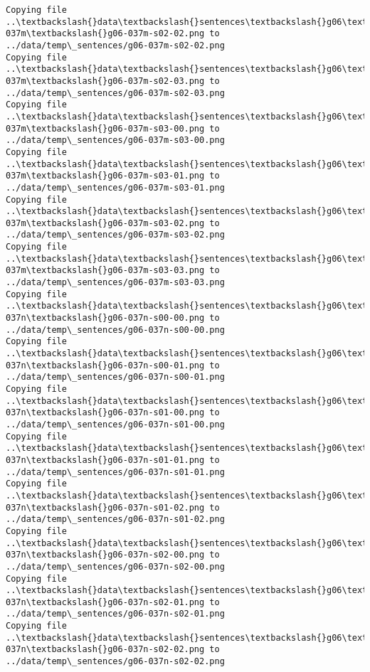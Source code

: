 \documentclass[11pt]{article}
\begin{document}
\begin{Verbatim}[commandchars=\\\{\}]
Copying file ..\textbackslash{}data\textbackslash{}sentences\textbackslash{}g06\textbackslash{}g06-037m\textbackslash{}g06-037m-s02-02.png to
../data/temp\_sentences/g06-037m-s02-02.png
Copying file ..\textbackslash{}data\textbackslash{}sentences\textbackslash{}g06\textbackslash{}g06-037m\textbackslash{}g06-037m-s02-03.png to
../data/temp\_sentences/g06-037m-s02-03.png
Copying file ..\textbackslash{}data\textbackslash{}sentences\textbackslash{}g06\textbackslash{}g06-037m\textbackslash{}g06-037m-s03-00.png to
../data/temp\_sentences/g06-037m-s03-00.png
Copying file ..\textbackslash{}data\textbackslash{}sentences\textbackslash{}g06\textbackslash{}g06-037m\textbackslash{}g06-037m-s03-01.png to
../data/temp\_sentences/g06-037m-s03-01.png
Copying file ..\textbackslash{}data\textbackslash{}sentences\textbackslash{}g06\textbackslash{}g06-037m\textbackslash{}g06-037m-s03-02.png to
../data/temp\_sentences/g06-037m-s03-02.png
Copying file ..\textbackslash{}data\textbackslash{}sentences\textbackslash{}g06\textbackslash{}g06-037m\textbackslash{}g06-037m-s03-03.png to
../data/temp\_sentences/g06-037m-s03-03.png
Copying file ..\textbackslash{}data\textbackslash{}sentences\textbackslash{}g06\textbackslash{}g06-037n\textbackslash{}g06-037n-s00-00.png to
../data/temp\_sentences/g06-037n-s00-00.png
Copying file ..\textbackslash{}data\textbackslash{}sentences\textbackslash{}g06\textbackslash{}g06-037n\textbackslash{}g06-037n-s00-01.png to
../data/temp\_sentences/g06-037n-s00-01.png
Copying file ..\textbackslash{}data\textbackslash{}sentences\textbackslash{}g06\textbackslash{}g06-037n\textbackslash{}g06-037n-s01-00.png to
../data/temp\_sentences/g06-037n-s01-00.png
Copying file ..\textbackslash{}data\textbackslash{}sentences\textbackslash{}g06\textbackslash{}g06-037n\textbackslash{}g06-037n-s01-01.png to
../data/temp\_sentences/g06-037n-s01-01.png
Copying file ..\textbackslash{}data\textbackslash{}sentences\textbackslash{}g06\textbackslash{}g06-037n\textbackslash{}g06-037n-s01-02.png to
../data/temp\_sentences/g06-037n-s01-02.png
Copying file ..\textbackslash{}data\textbackslash{}sentences\textbackslash{}g06\textbackslash{}g06-037n\textbackslash{}g06-037n-s02-00.png to
../data/temp\_sentences/g06-037n-s02-00.png
Copying file ..\textbackslash{}data\textbackslash{}sentences\textbackslash{}g06\textbackslash{}g06-037n\textbackslash{}g06-037n-s02-01.png to
../data/temp\_sentences/g06-037n-s02-01.png
Copying file ..\textbackslash{}data\textbackslash{}sentences\textbackslash{}g06\textbackslash{}g06-037n\textbackslash{}g06-037n-s02-02.png to
../data/temp\_sentences/g06-037n-s02-02.png

\end{Verbatim}
\end{document}
